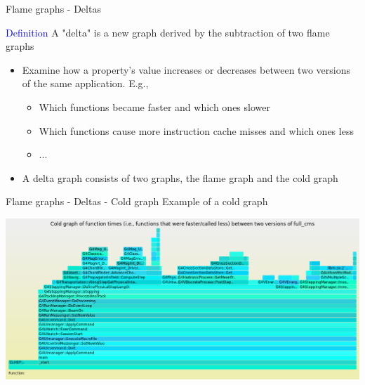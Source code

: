 \documentclass{beamer}
\begin{document}
\begin{frame}{Flame graphs - Deltas}

\textcolor{blue}{Definition} A "delta" is a new graph derived
by the subtraction of two flame graphs
\begin{itemize}
\item Examine how a property's value increases or decreases between two versions
of the same application. E.g.,
\begin{itemize}
\item Which functions became faster and which ones slower
\item Which functions cause more instruction cache misses and which ones less
\item ...
\end{itemize}
\item A delta graph consists of two graphs, the flame graph and the cold graph
\end{itemize}

\end{frame}

\begin{frame}{Flame graphs - Deltas - Cold graph}
Example of a cold graph

\begin{center}
  \includegraphics[width=1.0\textwidth]{dec.png}
\end{center}
\end{frame}

\begin{frame}
\begin{center}
\end{center}
\end{frame}
\end{document}
